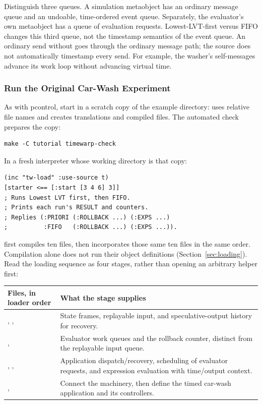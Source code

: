 Distinguish three queues. A simulation metaobject has an ordinary
message queue and an undoable, time-ordered event queue.
Separately, the evaluator's own metaobject has a queue of evaluation
requests. Lowest-LVT-first versus FIFO changes this third queue,
not the timestamp semantics of the event queue.
An ordinary send without  goes through the ordinary
message path; the source does not automatically timestamp every send.
For example, the washer's self-messages advance its work loop without
advancing virtual time.

\subsubsection{Run the Original Car-Wash Experiment}
\label{sec:tw-loading}

As with pcontrol, start in a scratch copy of the example directory:
 uses relative file names and creates
translations and compiled files. The automated check prepares the copy:

\begin{lstlisting}
make -C tutorial timewarp-check
\end{lstlisting}

In a fresh interpreter whose working directory is that copy:

\begin{codeblock}
\begin{lstlisting}
(inc "tw-load" :use-source t)
[starter <== [:start [3 4 6] 3]]
; Runs Lowest LVT first, then FIFO.
; Prints each run's RESULT and counters.
; Replies (:PRIORI (:ROLLBACK ...) (:EXPS ...)
;          :FIFO   (:ROLLBACK ...) (:EXPS ...)).
\end{lstlisting}
\end{codeblock}

 first compiles ten files, then incorporates
those same ten files in the same order. Compilation alone does not run
their object definitions (Section~\ref{sec:loading}). Read the loading
sequence as four stages, rather than opening an arbitrary helper first:

\begin{longtable}{L{0.44\textwidth}L{0.46\textwidth}}
\textbf{Files, in loader order} & \textbf{What the stage supplies}\\\hline
\endhead
{}, ,
 & State frames, replayable input, and
speculative-output history for recovery.\\
,  & Evaluator work queues and
the rollback counter, distinct from the replayable input queue.\\
, ,  &
Application dispatch/recovery, scheduling of evaluator requests, and
expression evaluation with time/output context.\\
,  & Connect the machinery, then
define the timed car-wash application and its controllers.\\
\end{longtable}

